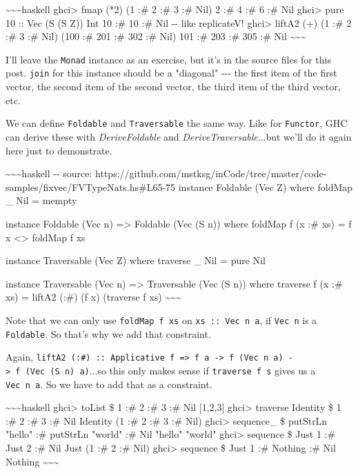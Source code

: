 \documentclass[]{article}
\begin{document}
\textasciitilde{}\textasciitilde{}\textasciitilde{}haskell ghci\textgreater{}
fmap (*2) (1 :\# 2 :\# 3 :\# Nil) 2 :\# 4 :\# 6 :\# Nil ghci\textgreater{} pure
10 :: Vec (S (S Z)) Int 10 :\# 10 :\# Nil -\/- like replicateV!
ghci\textgreater{} liftA2 (+) (1 :\# 2 :\# 3 :\# Nil) (100 :\# 201 :\# 302 :\#
Nil) 101 :\# 203 :\# 305 :\# Nil
\textasciitilde{}\textasciitilde{}\textasciitilde{}

I'll leave the \texttt{Monad} instance as an exercise, but it's in the source
files for this post. \texttt{join} for this instance should be a "diagonal"
-\/-\/- the first item of the first vector, the second item of the second
vector, the third item of the third vector, etc.

We can define \texttt{Foldable} and \texttt{Traversable} the same way. Like for
\texttt{Functor}, GHC can derive these with \emph{DeriveFoldable} and
\emph{DeriveTraversable}...but we'll do it again here just to demonstrate.

\textasciitilde{}\textasciitilde{}\textasciitilde{}haskell -\/- source:
https://github.com/mstksg/inCode/tree/master/code-samples/fixvec/FVTypeNats.hs\#L65-75
instance Foldable (Vec Z) where foldMap \_ Nil = mempty

instance Foldable (Vec n) =\textgreater{} Foldable (Vec (S n)) where foldMap f
(x :\# xs) = f x \textless{}\textgreater{} foldMap f xs

instance Traversable (Vec Z) where traverse \_ Nil = pure Nil

instance Traversable (Vec n) =\textgreater{} Traversable (Vec (S n)) where
traverse f (x :\# xs) = liftA2 (:\#) (f x) (traverse f xs)
\textasciitilde{}\textasciitilde{}\textasciitilde{}

Note that we can only use \texttt{foldMap\ f\ xs} on \texttt{xs\ ::\ Vec\ n\ a},
if \texttt{Vec\ n} is a \texttt{Foldable}. So that's why we add that constraint.

Again,
\texttt{liftA2\ (:\#)\ ::\ Applicative\ f\ =\textgreater{}\ f\ a\ -\textgreater{}\ f\ (Vec\ n\ a)\ -\textgreater{}\ f\ (Vec\ (S\ n)\ a)}...so
this only makes sense if \texttt{traverse\ f\ s} gives us a \texttt{Vec\ n\ a}.
So we have to add that as a constraint.

\textasciitilde{}\textasciitilde{}\textasciitilde{}haskell ghci\textgreater{}
toList \$ 1 :\# 2 :\# 3 :\# Nil {[}1,2,3{]} ghci\textgreater{} traverse Identity
\$ 1 :\# 2 :\# 3 :\# Nil Identity (1 :\# 2 :\# 3 :\# Nil) ghci\textgreater{}
sequence\_ \$ putStrLn "hello" :\# putStrLn "world" :\# Nil "hello" "world"
ghci\textgreater{} sequence \$ Just 1 :\# Just 2 :\# Nil Just (1 :\# 2 :\# Nil)
ghci\textgreater{} sequence \$ Just 1 :\# Nothing :\# Nil Nothing
\textasciitilde{}\textasciitilde{}\textasciitilde{}
\end{document}

